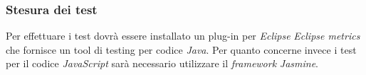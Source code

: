\subsubsection{Stesura dei test}

Per effettuare i test dovrà essere installato un plug-in per \textit{Eclipse} \textit{Eclipse metrics} che fornisce un tool di testing per codice \textit{Java}. Per quanto concerne invece i test per il codice \textit{JavaScript} sarà necessario utilizzare il \textit{framework} \textit{Jasmine}.



